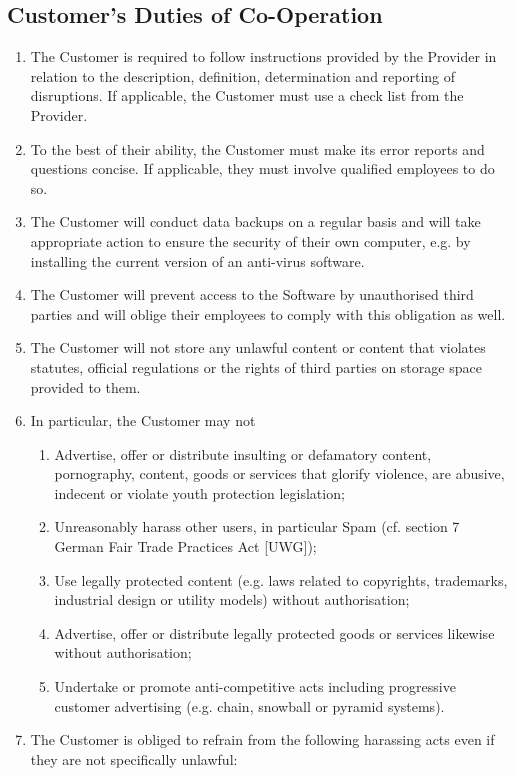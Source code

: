 \documentclass{terms}
\begin{document}
\subsection{Customer’s Duties of Co-Operation}
\begin{enumerate}
\item The Customer is required to follow instructions provided by the Provider in relation to the description, definition, determination and reporting of disruptions.
      If applicable, the Customer must use a check list from the Provider.
\item To the best of their ability, the Customer must make its error reports and questions concise.
      If applicable, they must involve qualified employees to do so.
\item The Customer will conduct data backups on a regular basis and will take appropriate action to ensure the security of their own computer, e.g. by installing the current version of an anti-virus software.
\item The Customer will prevent access to the Software by unauthorised third parties and will oblige their employees to comply with this obligation as well.
\item The Customer will not store any unlawful content or content that violates statutes, official regulations or the rights of third parties on storage space provided to them.
\item In particular, the Customer may not \begin{enumerate}
\item Advertise, offer or distribute insulting or defamatory content, pornography, content, goods or services that glorify violence, are abusive, indecent or violate youth protection legislation;
\item Unreasonably harass other users, in particular Spam (cf. section 7 German Fair Trade Practices Act [UWG]);
\item Use legally protected content (e.g. laws related to copyrights, trademarks, industrial design or utility models) without authorisation;
\item Advertise, offer or distribute legally protected goods or services likewise without authorisation;
\item Undertake or promote anti-competitive acts including progressive customer advertising (e.g. chain, snowball or pyramid systems).
\end{enumerate}
\item The Customer is obliged to refrain from the following harassing acts even if they are not specifically unlawful:\begin{enumerate}

\end{enumerate}
\end{enumerate}
\end{document}
